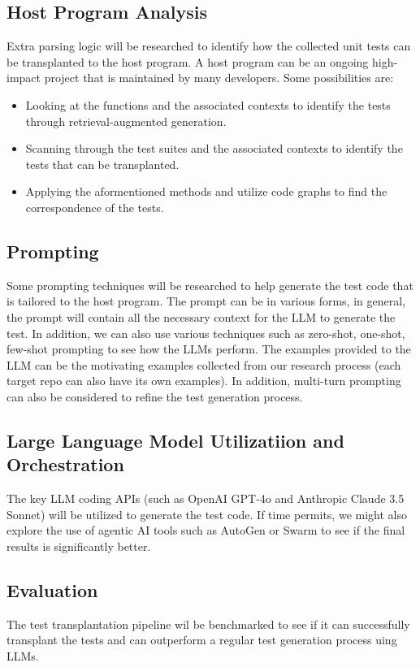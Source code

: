 \documentclass[sigconf]{acmart}
\begin{document}
\subsection{Host Program Analysis}
Extra parsing logic will be researched to identify how the collected unit tests can be transplanted to the host program. A host program can be an ongoing high-impact project that is maintained by many developers. Some possibilities are:
\begin{itemize}
\item Looking at the functions and the associated contexts to identify the tests through retrieval-augmented generation.
\item Scanning through the test suites and the associated contexts to identify the tests that can be transplanted.
\item Applying the aformentioned methods and utilize code graphs to find the correspondence of the tests.
\end{itemize}

\subsection{Prompting}
Some prompting techniques will be researched to help generate the test code that is tailored to the host program. The prompt can be in various forms, in general, the prompt will contain all the necessary context for the LLM to generate the test. In addition, we can also use various techniques such as zero-shot, one-shot, few-shot prompting to see how the LLMs perform. The examples provided to the LLM can be the motivating examples collected from our research process (each target repo can also have its own examples). In addition, multi-turn prompting can also be considered to refine the test generation process.

\subsection{Large Language Model Utilizatiion and Orchestration}
The key LLM coding APIs (such as OpenAI GPT-4o and Anthropic Claude 3.5 Sonnet) will be utilized to generate the test code. If time permits, we might also explore the use of agentic AI tools such as AutoGen or Swarm to see if the final results is significantly better.

\subsection{Evaluation}
The test transplantation pipeline wil be benchmarked to see if it can successfully transplant the tests and can outperform a regular test generation process uing LLMs.
\end{document}
